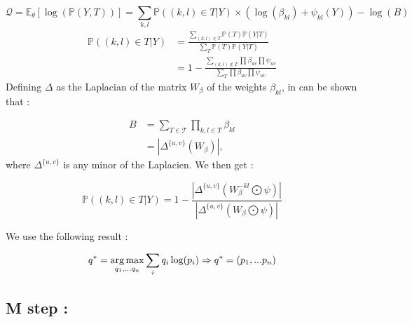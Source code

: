\documentclass[a4paper,10pt]{article}
\DeclareMathOperator*{\argmax}{arg\,max}
\begin{document}
\[ \mathcal{Q} = \mathds{E}_\theta[\log(\mathds{P}(Y,T))] = \sum_{k,l}  \mathds{P}((k,l)\in T | Y) \times \left( \log(\beta_{kl}) + \psi_{kl}(Y) \right)
 -\log(B)\]
 \begin{align*}
 \mathds{P}((k,l)\in T | Y)  &= \frac{\sum_{(k,l)\in T} \mathds{P}(T)\mathds{P}(Y|T)}{\sum_{T} \mathds{P}(T)\mathds{P}(Y|T)}\\
 &=1-\frac{\sum_{(k,l)\notin T} \prod \beta_{uv} \prod \psi_{uv}}{\sum_{T} \prod \beta_{uv} \prod \psi_{uv}}
 \end{align*}
 Defining $\Delta$ as the Laplacian of the matrix $W_{\beta}$ of the weights $\beta_{kl}$, in can be shown that :

\begin{align*}
B &= \sum_{T \in \mathcal{T}} \prod_{k,l\in T} \beta_{kl}\\
 &=|\Delta^{\{u,v\}}(W_{\beta})|,
\end{align*}
where $\Delta^{\{u,v\}}$ is any minor of the Laplacien. We then get :

\[ \mathds{P}((k,l)\in T | Y) =1-\frac{|\Delta^{\{u,v\}}(W_{\beta}^{-kl}\bigodot\psi)|}{|\Delta^{\{u,v\}}(W_{\beta}\bigodot\psi)|}\]


We use the following result :

\begin{equation}
 \label{res}
q^ * =  \argmax_{q_1,...q_n}  \sum_i q_i \log(p_i) \Rightarrow q^ * = (p_1,...p_n) \\
\end{equation}

\subsection{M step :\\}
\end{document}
